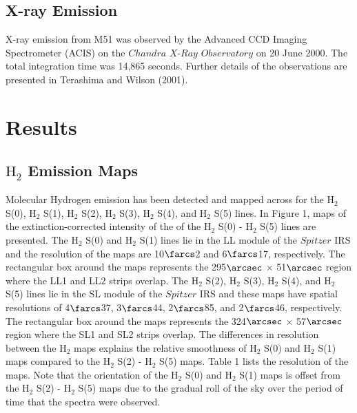\documentclass[manuscript]{aastex}
\begin{document}
\subsection{X-ray Emission}

X-ray emission from M51 was observed by the Advanced CCD Imaging Spectrometer (ACIS) on the $Chandra$ $X$-$Ray$ $Observatory$ on 20 June 2000.  The total integration time was 14,865 seconds.  Further details of the observations are presented in Terashima and Wilson (2001).

\section{Results}

\subsection{$\mathrm{H_2}$ Emission Maps}

Molecular Hydrogen emission has been detected and mapped across  for the $\mathrm{H_2}$ S(0), $\mathrm{H_2}$ S(1), $\mathrm{H_2}$ S(2), $\mathrm{H_2}$ S(3), $\mathrm{H_2}$ S(4), and $\mathrm{H_2}$ S(5) lines.  In Figure 1, maps of the extinction-corrected intensity of the of the $\mathrm{H_2}$ S(0) - $\mathrm{H_2}$ S(5) lines are presented.  The $\mathrm{H_2}$ S(0) and $\mathrm{H_2}$ S(1) lines lie in the LL module of the $Spitzer$ IRS and the resolution of the maps are 10$\farcs$2 and 6$\farcs$17, respectively.  The rectangular box around the maps represents the 295$\arcsec$ $\times$ 51$\arcsec$ region where the LL1 and LL2 strips overlap.  The $\mathrm{H_2}$ S(2), $\mathrm{H_2}$ S(3), $\mathrm{H_2}$ S(4), and $\mathrm{H_2}$ S(5) lines lie in the SL module of the $Spitzer$ IRS and these maps have spatial resolutions of 4$\farcs$37, 3$\farcs$44, 2$\farcs$85, and 2$\farcs$46, respectively.  The rectangular box around the maps represents the 324$\arcsec$ $\times$ 57$\arcsec$ region where the SL1 and SL2 strips overlap. The differences in resolution between the $\mathrm{H_2}$ maps explains the relative smoothness of $\mathrm{H_2}$ S(0) and $\mathrm{H_2}$ S(1) maps compared to the $\mathrm{H_2}$ S(2) - $\mathrm{H_2}$ S(5) maps.  Table 1 lists the resolution of the maps.  Note that the orientation of the $\mathrm{H_2}$ S(0) and $\mathrm{H_2}$ S(1) maps is offset from the $\mathrm{H_2}$ S(2) - $\mathrm{H_2}$ S(5) maps due to the gradual roll of the sky over the period of time that the spectra were observed.
\end{document}
